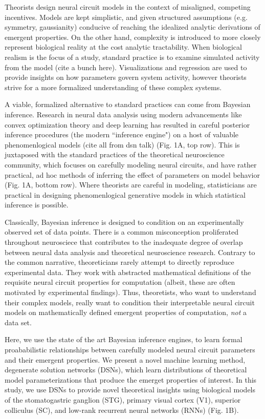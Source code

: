 \documentclass[11pt]{article}
\begin{document}
Theorists design neural circuit models in the context of misaligned, competing incentives.  Models are kept simplistic, and given structured assumptions (e.g. symmetry, gaussianity) conducive of reaching the idealized analytic derivations of emergent properties.  On the other hand, complexity is introduced to more closely represent biological reality at the cost analytic tractability.  When biological realism is the focus of a study, standard practice is to examine simulated activity from the model \cite{gutierrez2013multiple} (cite a bunch here).  Visualizations and regression are used to provide insights on how parameters govern system activity, however theorists strive for a more formalized understanding of these complex systems.

A viable, formalized alternative to standard practices can come from Bayesian inference.  Research in neural data analysis using modern advancements like convex optimization theory and deep learning has resulted in careful posterior inference procedures (the modern ``inference engine") on a host of valuable phenomenlogical models (cite all from dsn talk) (Fig. 1A, top row).  This is juxtaposed with the standard practices of the theoretical neuroscience community, which focuses on carefully modeling neural circuits, and have rather practical, ad hoc methods of inferring the effect of parameters on model behavior (Fig. 1A, bottom row).  Where theorists are careful in modeling, statisticians are practical in designing phenomenlogical generative models in which statistical inference is possible.

Classically, Bayesian inference is designed to condition on an experimentally observed set of data points.  There is a common misconception proliferated throughout neurosciece that contributes to the inadequate degree of overlap between neural data analysis and theoretical neuroscience research.  Contrary to the common narrative, theoreticians rarely attempt to directly reproduce experimental data.  They work with abstracted mathematical definitions of the requisite neural circuit properties for computation (albeit, these are often motivated by experimental findings).  Thus, theoretists, who want to understand their complex models, really want to condition their interpretable neural circuit models on mathematically defined emergent properties of computation, \textit{not} a data set.  

Here, we use the state of the art Bayesian inference engines, to learn formal proababilistic relationships between carefully modeled neural circuit parameters and their emergent properties.   We present a novel machine learning method, degenerate solution networks (DSNs), which learn distributions of theoretical model parameterizations that produce the emerget properties of interest.  In this study, we use DSNs to provide novel theoretical insights using biological models of the stomatogastric ganglion (STG), primary visual cortex (V1), superior colliculus (SC), and low-rank recurrent neural networks (RNNs) (Fig. 1B).
\end{document}
